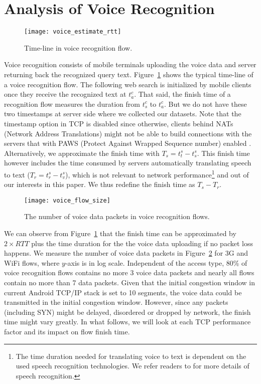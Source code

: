 
\section{Analysis of Voice Recognition}

\begin{figure}[th]
\centering
	\texttt{[image: voice\_estimate\_rtt]}
\caption{Time-line in voice recognition flow.}
\label{fig:voice_estimate_rtt}
\end{figure}

Voice recognition consists of mobile terminals uploading the voice data and server returning back the recognized query text. Figure~\ref{fig:voice_estimate_rtt} shows the typical time-line of a voice recognition flow. The following web search is initialized by mobile clients once they receive the recognized text at $t^c_a$. That said, the finish time of a recognition flow measures the duration from $t^c_s$ to $t^c_a$. But we do not have these two timestamps at server side where we collected our datasets. Note that the timestamp option in TCP is  disabled since otherwise, clients behind NATs (Network Address Translations) might not be able to build connections with the servers that with PAWS (Protect Against Wrapped Sequence number) \cite{rfc7323} enabled \cite{Wang:2011:USM:2018436.2018479}. Alternatively, we approximate the finish time with $T_s=t^s_t - t^s_s$. This finish time however includes the time consumed by servers automatically translating speech to text ($T_r=t^s_r - t^s_v$), which is not relevant to network performance\footnote{The time duration needed for translating voice to text is dependent on the used speech recognition technologies. We refer readers to \cite{36463,schalkwyk2010your} for more details of speech recognition.} and out of our interests in this paper. We thus redefine the finish time as $T_s-T_r$.

\begin{figure}[th]
	\centering
	\texttt{[image: voice\_flow\_size]}
	\caption{The number of voice data packets in voice recognition flows.}
	\label{fig:voice_flow_size}
\end{figure}

We can observe from Figure~\ref{fig:voice_estimate_rtt} that the finish time can be approximated by $2\times RTT$ plus the time duration for the the voice data uploading if no packet loss happens. We measure the number of voice data packets in Figure~\ref{fig:voice_flow_size} for 3G and WiFi flows, where $y$-axis is in log scale. Independent of the access type, 80\% of voice recognition flows contains no more 3 voice data packets and nearly all flows contain no more than 7 data packets. Given that the initial congestion window in current Android TCP/IP stack is set to 10 segments\cite{dukkipati2010argument}, the voice data could be transmitted in the initial congestion window. However, since any packets (including SYN) might be delayed, disordered or dropped by network, the finish time might vary greatly. In what follows, we will look at each TCP performance factor and its impact on flow finish time. 



